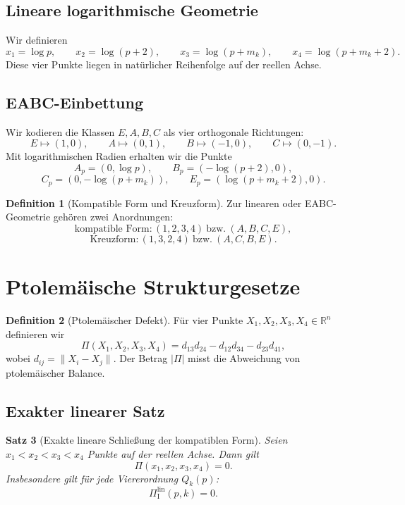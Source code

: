 \documentclass[11pt,a4paper]{article}
\newtheorem{satz}{Satz}
\theoremstyle{definition}
\newtheorem{definition}[satz]{Definition}
\theoremstyle{remark}
\newcommand{\R}{\mathbb{R}}
\begin{document}
\subsection{Lineare logarithmische Geometrie}

Wir definieren
\[
x_1=\log p,\qquad x_2=\log(p+2),\qquad x_3=\log(p+m_k),\qquad x_4=\log(p+m_k+2).
\]
Diese vier Punkte liegen in natürlicher Reihenfolge auf der reellen Achse.

\subsection{EABC-Einbettung}

Wir kodieren die Klassen $E,A,B,C$ als vier orthogonale Richtungen:
\[
E\mapsto (1,0),\qquad A\mapsto (0,1),\qquad B\mapsto (-1,0),\qquad C\mapsto (0,-1).
\]
Mit logarithmischen Radien erhalten wir die Punkte
\[
A_p=(0,\log p),\qquad B_p=(-\log(p+2),0),
\]
\[
C_p=(0,-\log(p+m_k)),\qquad E_p=(\log(p+m_k+2),0).
\]

\begin{definition}[Kompatible Form und Kreuzform]
Zur linearen oder EABC-Geometrie gehören zwei Anordnungen:
\[
\text{kompatible Form}: (1,2,3,4)\ \text{bzw.}\ (A,B,C,E),
\]
\[
\text{Kreuzform}: (1,3,2,4)\ \text{bzw.}\ (A,C,B,E).
\]
\end{definition}

\section{Ptolemäische Strukturgesetze}

\begin{definition}[Ptolemäischer Defekt]
Für vier Punkte $X_1,X_2,X_3,X_4\in \R^n$ definieren wir
\[
\Pi(X_1,X_2,X_3,X_4)
=
d_{13}d_{24}-d_{12}d_{34}-d_{23}d_{41},
\]
wobei $d_{ij}=\|X_i-X_j\|$.
Der Betrag $|\Pi|$ misst die Abweichung von ptolemäischer Balance.
\end{definition}

\subsection{Exakter linearer Satz}

\begin{satz}[Exakte lineare Schließung der kompatiblen Form]
Seien $x_1<x_2<x_3<x_4$ Punkte auf der reellen Achse. Dann gilt
\[
\Pi(x_1,x_2,x_3,x_4)=0.
\]
Insbesondere gilt für jede Viererordnung $Q_k(p)$:
\[
\Pi_{\mathrm I}^{\mathrm{lin}}(p,k)=0.
\]
\end{satz}
\end{document}
